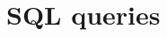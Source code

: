 \documentclass{article}
\begin{document}
\section{SQL queries}

\begin{comment}
\begin{itemize}
\item INSERT INTO sessions (id, expires) VALUES (\%(id)s, \%(exp)s)
\item SELECT * FROM comments NATURAL JOIN users WHERE EID=\%(id)i ORDER BY madeat
\item SELECT * FROM event ORDER BY name
\item SELECT * FROM event WHERE eid=\%(id)i
\item SELECT * FROM memberof NATURAL JOIN clubusers WHERE semail=\%(u)s
\item SELECT * FROM reservation NATURAL LEFT OUTER JOIN ( SELECT COUNT(against)
AS conflicts, rid FROM resconflicts NATURAL JOIN reservation WHERE EID=\%(event)i GROUP BY rid ) AS conflicting NATURAL LEFT OUTER JOIN room WHERE reservation.eid= \%(event)i ORDER BY starttime
\item SELECT * FROM reservation NATURAL LEFT OUTER JOIN ( SELECT count(r2.RID)
AS conflicts, r1.RID FROM reservation AS r1, reservation AS r2 WHERE
(r1.startTime, r1.endTime) OVERLAPS (r2.startTime, r2.endTime) AND
r1.EID=\%(event)i AND r2.EID!=\%(event)i AND r1.roomNum=r2.roomNum AND
r1.building=r2.building GROUP BY r1.RID ) AS conflicting NATURAL LEFT OUTER JOIN
room WHERE reservation.eid = \%(event)i ORDER BY starttime
\item SELECT * FROM room ORDER BY building, roomnum
\item SELECT * FROM room WHERE building=\%(building)s ORDER BY roomnum
\item SELECT * FROM room WHERE roomnum=\%(room)s AND building=\%(building)s
\item SELECT * FROM runBy NATURAL JOIN clubusers WHERE eid=\%(id)i ORDER BY name
\item SELECT * FROM users LEFT OUTER JOIN admin ON email = aEmail LEFT OUTER
JOIN student ON email = sEmail LEFT OUTER JOIN club ON email = cEmail WHERE
email = \%(email)s
\item SELECT * FROM users ORDER BY name
\item SELECT * FROM users WHERE email=\%(user)s AND password=\%(hash)s
\item SELECT COUNT(*) AS c, building, roomnum FROM room NATURAL JOIN reservation GROUP BY building, roomnum ORDER BY COUNT(*) DESC LIMIT 10

\end{comment}
\end{document}
